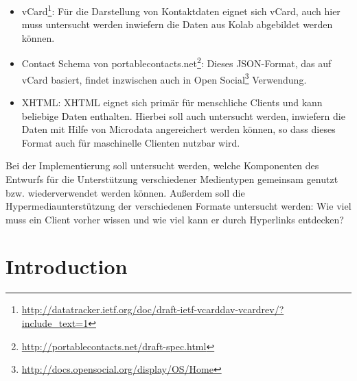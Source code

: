 \documentclass[11pt,a4paper,headsepline,twoside]{scrartcl}		%
\begin{document}
\begin{itemize}
\item
  vCard\footnote{\url{http://datatracker.ietf.org/doc/draft-ietf-vcarddav-vcardrev/?include_text=1}}:
  Für die Darstellung von Kontaktdaten eignet sich vCard, auch hier muss
  untersucht werden inwiefern die Daten aus Kolab abgebildet werden können.
\item Contact Schema von
  portablecontacts.net\footnote{\url{http://portablecontacts.net/draft-spec.html}}:
  Dieses JSON-Format, das auf vCard basiert, findet inzwischen auch in Open
  Social\footnote{\url{http://docs.opensocial.org/display/OS/Home}} Verwendung.
\item XHTML: XHTML eignet sich primär für menschliche Clients und kann beliebige
  Daten enthalten. Hierbei soll auch untersucht werden, inwiefern die Daten mit
  Hilfe von Microdata angereichert werden können, so dass dieses Format auch für
  maschinelle Clienten nutzbar wird.
\end{itemize}

Bei der Implementierung soll untersucht werden, welche Komponenten des Entwurfs
für die Unterstützung verschiedener Medientypen gemeinsam genutzt
bzw. wiederverwendet werden können. Außerdem soll die Hypermediaunterstützung
der verschiedenen Formate untersucht werden: Wie viel muss ein Client vorher
wissen und wie viel kann er durch Hyperlinks entdecken?

\tableofcontents{}
\newpage{}

\section{Introduction}
\label{sec:introduction}



\end{document}
